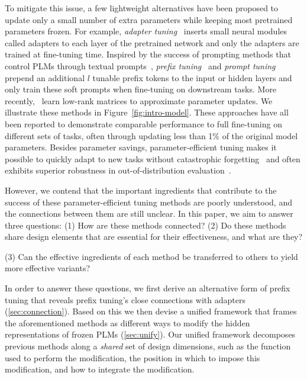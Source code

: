 To mitigate this issue, a few lightweight alternatives have been proposed to update only a small number of extra parameters while keeping most pretrained parameters frozen. For example, \emph{adapter tuning}~\citep{houlsby2019parameter} inserts small neural modules called adapters to each layer of the pretrained network and only the adapters are trained at fine-tuning time. Inspired by the success of prompting methods that control PLMs through textual prompts~\citep{brown2020language,liu2021pre}, \emph{prefix tuning}~\citep{li2021prefix} and \emph{prompt tuning}~\citep{lester2021power} prepend an additional $l$ tunable prefix tokens to the input or hidden layers and only train these soft prompts when fine-tuning on downstream tasks. More recently,~\citet{hu2021lora} learn low-rank matrices to approximate parameter updates. We illustrate these methods in Figure~\ref{fig:intro-model}. These approaches have all been reported to demonstrate comparable performance to full fine-tuning on different sets of tasks, often through updating less than 1\% of the original model parameters. Besides parameter savings, parameter-efficient tuning makes it possible to quickly adapt to new tasks without catastrophic forgetting~\citep{pfeiffer2021adapterfusion} and often exhibits superior robustness in out-of-distribution evaluation~\citep{li2021prefix}. 

However, we contend that the important ingredients that contribute to the success of these parameter-efficient tuning methods are poorly understood, and the connections between them are still unclear. In this paper, we aim to answer three questions: (1) How are these methods connected? (2) Do these methods share design elements that are essential for their effectiveness, and what are they?

(3) Can the effective ingredients of each method be transferred to others to yield more effective variants? 

In order to answer these questions, we first derive an alternative form of prefix tuning that reveals prefix tuning's close connections with adapters (\textsection\ref{sec:connection}).
Based on this we then devise a unified framework that frames the aforementioned methods as different ways to modify the hidden representations of frozen PLMs (\textsection\ref{sec:unify}).
Our unified framework decomposes previous methods along a \emph{shared} set of design dimensions, such as the function used to perform the modification, the position in which to impose this modification, and how to integrate the modification.

